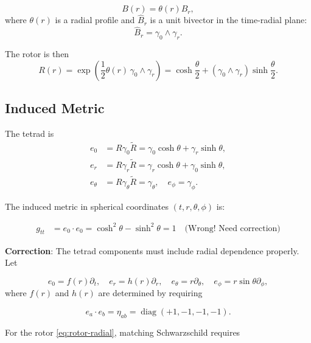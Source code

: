 \documentclass[11pt,a4paper]{article}
\numberwithin{equation}{section}
\theoremstyle{plain}
\theoremstyle{definition}
\theoremstyle{remark}
\newcommand{\rev}[1]{\widetilde{#1}}       %
\DeclareMathOperator{\diag}{diag}
\begin{document}
\begin{equation}
B(r) = \theta(r) \hat{B}_r,
\label{eq:ansatz-bivector}
\end{equation}
where $\theta(r)$ is a radial profile and $\hat{B}_r$ is a unit bivector in the time-radial plane:
\begin{equation}
\hat{B}_r = \gamma_0 \wedge \gamma_r.
\end{equation}

The rotor is then
\begin{equation}
R(r) = \exp\left(\frac{1}{2}\theta(r)\, \gamma_0 \wedge \gamma_r\right) = \cosh\frac{\theta}{2} + (\gamma_0 \wedge \gamma_r)\sinh\frac{\theta}{2}.
\label{eq:rotor-radial}
\end{equation}

\subsection{Induced Metric}

The tetrad is
\begin{align}
e_0 &= R \gamma_0 \rev{R} = \gamma_0 \cosh\theta + \gamma_r \sinh\theta,\\
e_r &= R \gamma_r \rev{R} = \gamma_r \cosh\theta + \gamma_0 \sinh\theta,\\
e_\theta &= R \gamma_\theta \rev{R} = \gamma_\theta, \quad e_\phi = \gamma_\phi.
\end{align}

The induced metric in spherical coordinates $(t, r, \theta, \phi)$ is:

\begin{align}
g_{tt} &= e_0 \cdot e_0 = \cosh^2\theta - \sinh^2\theta = 1 \quad \text{(Wrong! Need correction)}
\end{align}

\textbf{Correction}: The tetrad components must include radial dependence properly. Let

\begin{equation}
e_0 = f(r) \partial_t, \quad e_r = h(r) \partial_r, \quad e_\theta = r \partial_\theta, \quad e_\phi = r\sin\theta \partial_\phi,
\end{equation}
where $f(r)$ and $h(r)$ are determined by requiring

\begin{equation}
e_a \cdot e_b = \eta_{ab} = \diag(+1, -1, -1, -1).
\end{equation}

For the rotor \eqref{eq:rotor-radial}, matching Schwarzschild requires
\end{document}
